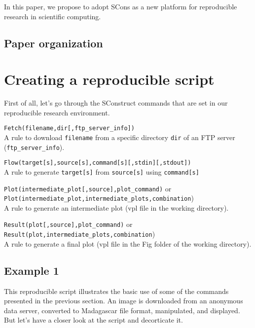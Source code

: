 In this paper, we propose to adopt SCons as a new platform for
reproducible research in scientific computing.

\subsection{Paper organization}

\newpage
\section{Creating a reproducible script}
%
First of all, let's go through the SConstruct commands that are set in
our reproducible research environment.

\noindent\texttt{Fetch(filename,dir[,ftp\_server\_info])}\\
\indent A rule to download \texttt{filename} from a specific
directory \texttt{dir} of an FTP server
(\texttt{ftp\_server\_info}).

\noindent\texttt{Flow(target[s],source[s],command[s][,stdin][,stdout])}\\
\indent A rule to generate \texttt{target[s]} from \texttt{source[s]}
using \texttt{command[s]}

\noindent\texttt{Plot(intermediate\_plot[,source],plot\_command)} or\\
\texttt{Plot(intermediate\_plot,intermediate\_plots,combination})\\
\indent A rule to generate an intermediate plot (vpl file in the
working directory).

\noindent\texttt{Result(plot[,source],plot\_command)} or\\ 
\texttt{Result(plot,intermediate\_plots,combination})\\
\indent A rule to generate a final plot (vpl file in the Fig folder of
the working directory).

\subsection{Example 1}
%


This reproducible script illustrates the basic use of some of the
commands presented in the previous section. An image is downloaded
from an anonymous data server, converted to Madagascar file format,
manipulated, and displayed. But let's have a closer look at the script
and decorticate it.\\

